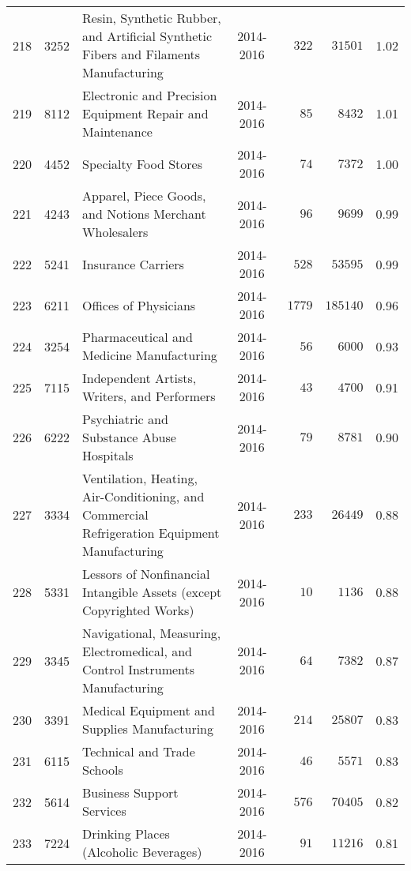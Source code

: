 \documentclass[9pt, oneside]{article}   	%
\begin{document}
\begin{longtable}{lcp{3in}cccc}
218  & 3252 & Resin, Synthetic Rubber, and Artificial Synthetic Fibers and Filaments Manufacturing & 2014-2016 & $\phantom{00}322$ & $\phantom{0}31501$ &  1.02 \\
219  & 8112 & Electronic and Precision Equipment Repair and Maintenance & 2014-2016 & $\phantom{000}85$ & $\phantom{00}8432$ &  1.01 \\
220  & 4452 & Specialty Food Stores & 2014-2016 & $\phantom{000}74$ & $\phantom{00}7372$ &  1.00 \\
221  & 4243 & Apparel, Piece Goods, and Notions Merchant Wholesalers & 2014-2016 & $\phantom{000}96$ & $\phantom{00}9699$ &  0.99 \\
222  & 5241 & Insurance Carriers & 2014-2016 & $\phantom{00}528$ & $\phantom{0}53595$ &  0.99 \\
223  & 6211 & Offices of Physicians & 2014-2016 & $\phantom{0}1779$ & $185140$ &  0.96 \\
224  & 3254 & Pharmaceutical and Medicine Manufacturing & 2014-2016 & $\phantom{000}56$ & $\phantom{00}6000$ &  0.93 \\
225  & 7115 & Independent Artists, Writers, and Performers & 2014-2016 & $\phantom{000}43$ & $\phantom{00}4700$ &  0.91 \\
226  & 6222 & Psychiatric and Substance Abuse Hospitals & 2014-2016 & $\phantom{000}79$ & $\phantom{00}8781$ &  0.90 \\
227  & 3334 & Ventilation, Heating, Air-Conditioning, and Commercial Refrigeration Equipment Manufacturing & 2014-2016 & $\phantom{00}233$ & $\phantom{0}26449$ &  0.88 \\
228  & 5331 & Lessors of Nonfinancial Intangible Assets (except Copyrighted Works) & 2014-2016 & $\phantom{000}10$ & $\phantom{00}1136$ &  0.88 \\
229  & 3345 & Navigational, Measuring, Electromedical, and Control Instruments Manufacturing & 2014-2016 & $\phantom{000}64$ & $\phantom{00}7382$ &  0.87 \\
230  & 3391 & Medical Equipment and Supplies Manufacturing & 2014-2016 & $\phantom{00}214$ & $\phantom{0}25807$ &  0.83 \\
231  & 6115 & Technical and Trade Schools & 2014-2016 & $\phantom{000}46$ & $\phantom{00}5571$ &  0.83 \\
232  & 5614 & Business Support Services & 2014-2016 & $\phantom{00}576$ & $\phantom{0}70405$ &  0.82 \\
233  & 7224 & Drinking Places (Alcoholic Beverages) & 2014-2016 & $\phantom{000}91$ & $\phantom{0}11216$ &  0.81 \\

\end{longtable}
\end{document}

